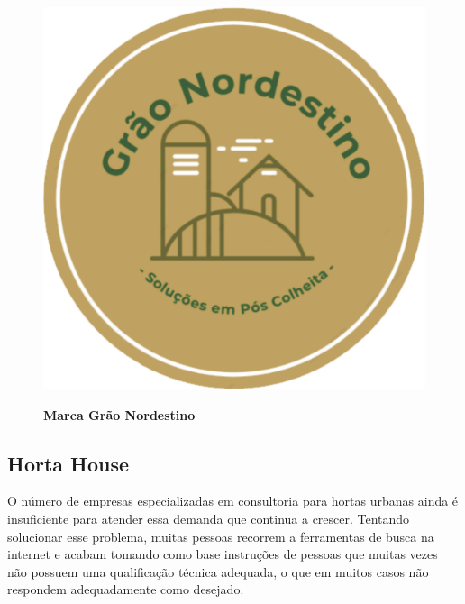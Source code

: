\begin{figure}[H]
\centering
\caption{\textbf{Marca Grão Nordestino}}
\includegraphics[scale=0.4]{Imagens/graonordestino.png}
\label{figura_21}
\end{figure}

\subsection{Horta House}


O número de empresas especializadas em consultoria para hortas urbanas ainda é insuficiente para atender essa demanda que continua a crescer. Tentando solucionar esse problema, muitas pessoas recorrem a ferramentas de busca na internet e acabam tomando como base instruções de pessoas que muitas vezes não possuem uma qualificação técnica adequada, o que em muitos casos não respondem adequadamente como desejado.


